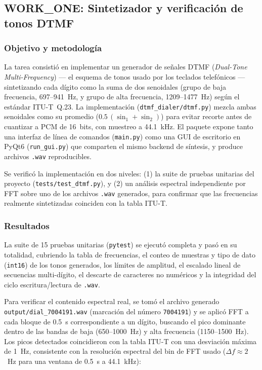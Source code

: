 
\subsection{WORK\_ONE: Sintetizador y verificación de tonos DTMF}

\subsubsection{Objetivo y metodología}

La tarea consistió en implementar un generador de señales DTMF
(\emph{Dual-Tone Multi-Frequency}) — el esquema de tonos usado por los
teclados telefónicos — sintetizando cada dígito como la suma de dos
senoidales (grupo de baja frecuencia, 697--941~Hz, y grupo de alta
frecuencia, 1209--1477~Hz) según el estándar ITU-T~Q.23. La implementación
(\texttt{dtmf\_dialer/dtmf.py}) mezcla ambas senoidales como su promedio
($0.5\,(\sin_1+\sin_2)$) para evitar recorte antes de cuantizar a PCM de
16~bits, con muestreo a 44.1~kHz. El paquete expone tanto una interfaz de
línea de comandos (\texttt{main.py}) como una GUI de escritorio en PyQt6
(\texttt{run\_gui.py}) que comparten el mismo backend de síntesis, y
produce archivos \texttt{.wav} reproducibles.

Se verificó la implementación en dos niveles: (1) la suite de pruebas
unitarias del proyecto (\texttt{tests/test\_dtmf.py}), y (2) un análisis
espectral independiente por FFT sobre uno de los archivos \texttt{.wav}
generados, para confirmar que las frecuencias realmente sintetizadas
coinciden con la tabla ITU-T.

\subsubsection{Resultados}

La suite de 15 pruebas unitarias (\texttt{pytest}) se ejecutó completa y
pasó en su totalidad, cubriendo la tabla de frecuencias, el conteo de
muestras y tipo de dato (\texttt{int16}) de los tonos generados, los
límites de amplitud, el escalado lineal de secuencias multi-dígito, el
descarte de caracteres no numéricos y la integridad del ciclo
escritura/lectura de \texttt{.wav}.

Para verificar el contenido espectral real, se tomó el archivo generado
\texttt{output/dial\_7004191.wav} (marcación del número \texttt{7004191})
y se aplicó FFT a cada bloque de 0.5~s correspondiente a un dígito,
buscando el pico dominante dentro de las bandas de baja (650--1000~Hz) y
alta frecuencia (1150--1500~Hz). Los picos detectados coincidieron con la
tabla ITU-T con una desviación máxima de 1~Hz, consistente con la
resolución espectral del bin de FFT usado ($\Delta f \approx 2$~Hz para
una ventana de 0.5~s a 44.1~kHz):

